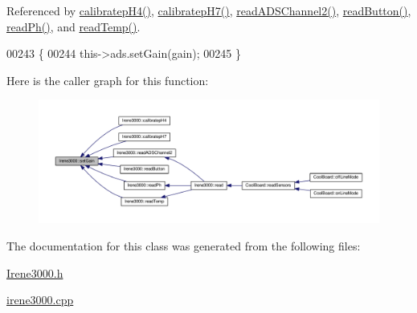 Referenced by \hyperlink{irene3000_8cpp_source_l00341}{calibratep\+H4()}, \hyperlink{irene3000_8cpp_source_l00325}{calibratep\+H7()}, \hyperlink{irene3000_8cpp_source_l00256}{read\+A\+D\+S\+Channel2()}, \hyperlink{irene3000_8cpp_source_l00230}{read\+Button()}, \hyperlink{irene3000_8cpp_source_l00270}{read\+Ph()}, and \hyperlink{irene3000_8cpp_source_l00291}{read\+Temp()}.


\begin{DoxyCode}
00243 \{
00244     this->ads.setGain(gain);
00245 \}
\end{DoxyCode}
Here is the caller graph for this function\+:
\nopagebreak
\begin{figure}[H]
\begin{center}
\leavevmode
\includegraphics[width=350pt]{class_irene3000_aff7c5da186b388e7272e63ff88a20c34_icgraph}
\end{center}
\end{figure}


The documentation for this class was generated from the following files\+:\begin{DoxyCompactItemize}
\item 
\hyperlink{_irene3000_8h}{Irene3000.\+h}\item 
\hyperlink{irene3000_8cpp}{irene3000.\+cpp}\end{DoxyCompactItemize}
